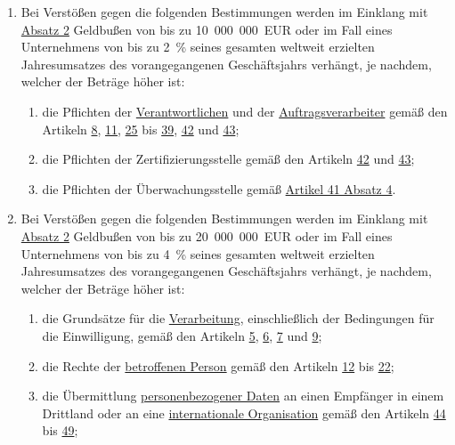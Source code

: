 \begin{enumerate}
  \item Bei Verstößen gegen die folgenden Bestimmungen werden im Einklang mit \hyperref[itm:83-2]{Absatz 2} Geldbußen
   von bis zu 10~000~000~EUR oder im Fall eines Unternehmens von bis zu 2~\% seines gesamten weltweit erzielten
   Jahresumsatzes des vorangegangenen Geschäftsjahrs verhängt, je nachdem, welcher der Beträge höher ist:
  \label{itm:83-4}

  \begin{enumerate}
  
    \item die Pflichten der \hyperref[itm:04-7]{Verantwortlichen} und der \hyperref[itm:04-8]{Auftragsverarbeiter} gemäß den Artikeln \hyperref[ch:8]{8},
     \hyperref[ch:11]{11}, \hyperref[ch:25]{25} bis \hyperref[ch:39]{39}, \hyperref[ch:42]{42} und \hyperref[ch:43]{43};
    \label{itm:83-4a}

    \item die Pflichten der Zertifizierungsstelle gemäß den Artikeln \hyperref[ch:42]{42} und \hyperref[ch:43]{43};
    \label{itm:83-4b}

    \item die Pflichten der Überwachungsstelle gemäß \hyperref[itm:41-4]{Artikel 41 Absatz 4}.
    \label{itm:83-4c}

  \end{enumerate}

  \item Bei Verstößen gegen die folgenden Bestimmungen werden im Einklang mit \hyperref[itm:83-2]{Absatz 2} Geldbußen
   von bis zu 20~000~000~EUR oder im Fall eines Unternehmens von bis zu 4~\% seines gesamten weltweit erzielten
   Jahresumsatzes des vorangegangenen Geschäftsjahrs verhängt, je nachdem, welcher der Beträge höher ist:
  \label{itm:83-5}

  \begin{enumerate}
  
    \item die Grundsätze für die \hyperref[itm:04-2]{Verarbeitung}, einschließlich der Bedingungen für die Einwilligung, gemäß den Artikeln
     \hyperref[ch:5]{5}, \hyperref[ch:6]{6}, \hyperref[ch:7]{7} und \hyperref[ch:9]{9};
    \label{itm:83-5a}

    \item die Rechte der \hyperref[itm:04-1]{betroffenen Person} gemäß den Artikeln \hyperref[ch:12]{12} bis \hyperref[ch:22]{22};
    \label{itm:83-5b}

    \item die Übermittlung \hyperref[itm:04-1]{personenbezogener Daten} an einen Empfänger in einem Drittland oder an eine \hyperref[itm:04-29]{internationale
     Organisation} gemäß den Artikeln \hyperref[ch:44]{44} bis \hyperref[ch:49]{49};
    \label{itm:83-5c}


\end{enumerate}
\end{enumerate}
